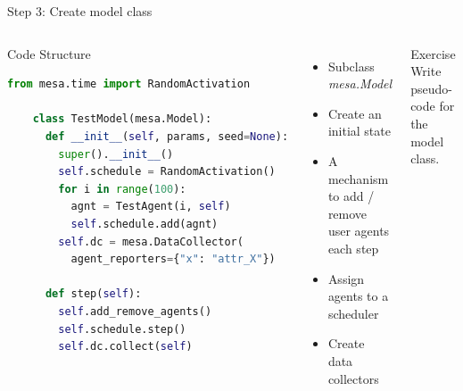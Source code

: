 \documentclass{beamer}
\begin{document}
\begin{frame}[fragile]{Step 3: Create model class}
    \begin{columns}

        \begin{block}{Code Structure}
            \begin{lstlisting}[language=Python, basicstyle=\footnotesize, xleftmargin=-16pt, columns=fullflexible]
    from mesa.time import RandomActivation
    
    class TestModel(mesa.Model):
      def __init__(self, params, seed=None):
        super().__init__()
        self.schedule = RandomActivation()
        for i in range(100):
          agnt = TestAgent(i, self)
          self.schedule.add(agnt)
        self.dc = mesa.DataCollector(
          agent_reporters={"x": "attr_X"})
        
      def step(self):
        self.add_remove_agents()
        self.schedule.step()
        self.dc.collect(self)
    \end{lstlisting}
        \end{block}

        \begin{itemize}
            \item Subclass \textit{mesa.Model}
            \item Create an initial state
            \item A mechanism to add / remove user agents each step
            \item Assign agents to a scheduler
            \item Create data collectors
        \end{itemize}
        \bigskip
        \begin{block}{Exercise}
            Write pseudo-code for the model class.
        \end{block}
    \end{columns}

\end{frame}
\end{document}
